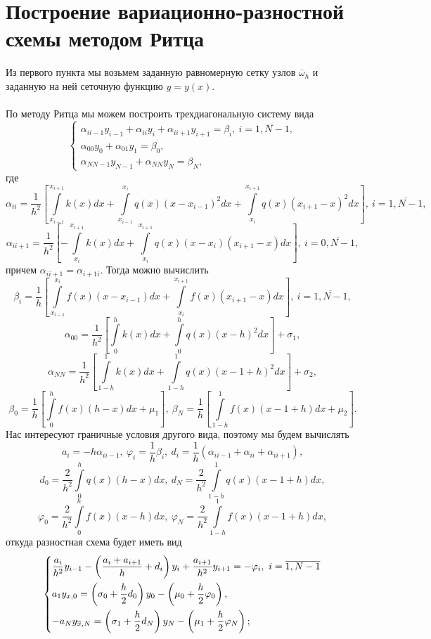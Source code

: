 \documentclass[a4paper, 12pt]{article}
\begin{document}
    \section{Построение вариационно-разностной схемы методом Ритца}
    Из первого пункта мы возьмем заданную равномерную сетку узлов $\overline \omega_h$ и заданную на ней сеточную функцию $y = y(x)$.
    \\\\
    По методу Ритца мы можем построить трехдиагональную систему вида
    \begin{equation}
    	\begin{cases}
    		\alpha_{ii-1} y_{i-1} + \alpha_{ii} y_i + \alpha_{i i+1} y_{i+1} = \beta_i,\ i = \overline {1, N -1},\\
    		\alpha_{00} y_0 + \alpha_{01}y_1 = \beta_0,\\
    		\alpha_{NN-1} y_{N-1} + \alpha_{NN}y_N = \beta_N,
    	\end{cases}
    \end{equation}
    где $$\alpha_{ii} = \dfrac{1}{h^2}\left[ \int\limits_{x_{i-1}}^{x_{i+1}} k(x)dx +\int\limits_{x_{i-1}}^{x_i}q(x)(x-x_{i-1})^2dx + \int\limits_{x_i}^{x_{i+1}}q(x)(x_{i+1}-x)^2dx \right],\ i = \overline{1, N-1},$$
    $$\alpha_{ii+1} = \dfrac{1}{h^2} \left[-\int\limits_{x_i}^{x_{i+1}}k(x)dx + \int\limits_{x_i}^{x_{i+1}}q(x)(x-x_i)(x_{i+1} - x)dx\right],\ i = \overline {0, N-1},$$
    причем $\alpha_{ii+1} = \alpha_{i+1i}$. Тогда можно вычислить
    $$\beta_i = \dfrac{1}{h} \left[\int\limits_{x_{i-1}}^{x_i}f(x)(x-x_{i-1})dx + \int\limits_{x_i}^{x_{i+1}}f(x)(x_{i+1}-x)dx\right],\ i = \overline{1, N-1},$$
    $$\alpha_{00} = \dfrac{1}{h^2}\left[\int\limits_0^h k(x)dx + \int\limits_0^h q(x)(x-h)^2dx\right] + \sigma_1,$$
    $$\alpha_{NN} = \dfrac{1}{h^2}\left[\int\limits_{1-h}^1 k(x)dx + \int\limits_{1-h}^1 q(x)(x-1+h)^2dx\right] + \sigma_2,$$
    $$\beta_0 = \dfrac 1h \left[\int\limits_0^h f(x)(h-x)dx + \mu_1\right],\ \beta_N =  \dfrac{1}{h} \left[\int\limits_{1-h}^1 f(x)(x-1+h)dx + \mu_2\right].$$
    Нас интересуют граничные условия другого вида, поэтому мы будем вычислять
    $$a_i = -h\alpha_{ii-1},\ \varphi_i = \dfrac 1 h \beta_i,\ d_i = \dfrac 1h(\alpha_{ii-1} +\alpha_{ii} + \alpha_{ii+1}),$$
    $$d_0 = \dfrac{2}{h^2}\int\limits_0^h q(x)(h-x)dx,\ d_N = \dfrac{2}{h^2}\int\limits_{1-h}^1 q(x)(x-1+h)dx,$$
    $$\varphi_0 = \dfrac{2}{h^2}\int\limits_0^h f(x)(x-h)dx,\ \varphi_N=\dfrac{2}{h^2}\int\limits_{1-h}^1 f(x)(x-1+h)dx,$$
    откуда
    разностная схема будет иметь вид	
    \begin{equation*}
    	\begin{dcases}
    		\dfrac{a_i}{h^2}y_{i-1} - \left(\dfrac{a_i +a_{i+1}}{h}+d_i\right)y_i + \dfrac{a_{i+1}}{h^2}y_{i+1} = -\varphi_i,\ i=\overline {1,N-1}\\
    		a_1 y_{x,0} = \left(\sigma_0 + \dfrac h2 d_0\right)y_0 - \left(\mu_0 + \dfrac h2 \varphi_0\right),\\
    		-a_N y_{\overline x, N} = \left(\sigma_1 + \dfrac h2 d_N\right)y_N - \left(\mu_1 + \dfrac h2 \varphi_N\right);
    	\end{dcases}
    \end{equation*}
\end{document}
